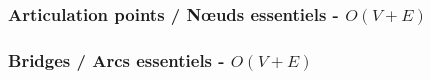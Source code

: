 \documentclass[landscape,a4paper,twocolumn,10pt]{report}
\begin{document}
%

\subsubsection{Articulation points / N\oe uds essentiels - $O(V + E)$}


\subsubsection{Bridges / Arcs essentiels - $O(V + E)$}

\end{document}
